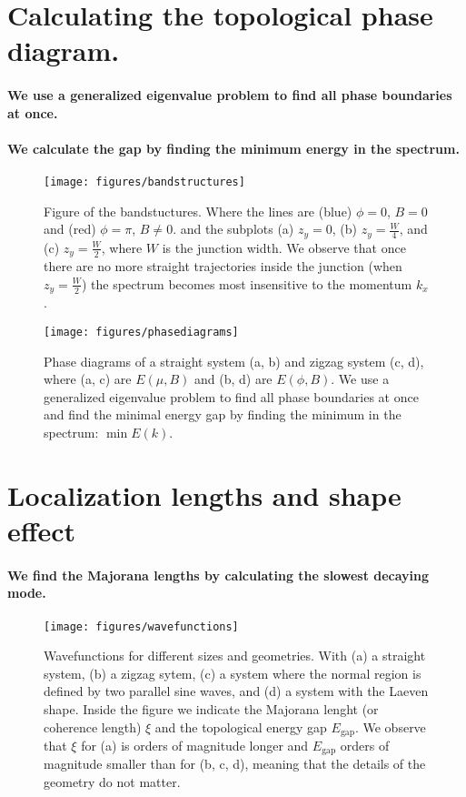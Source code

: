\documentclass[english, twocolumn, 10pt, aps, superscriptaddress, floatfix, prb, citeautoscript]{revtex4-1}
\renewcommand{\comment}[2]{#2}
\renewcommand{\comment}{\paragraph}
\begin{document}
\section{Calculating the topological phase diagram.}

\comment{We use a generalized eigenvalue problem to find all phase boundaries at once.}

\comment{We calculate the gap by finding the minimum energy in the spectrum.}

\begin{figure}[!htb]
\texttt{[image: figures/bandstructures]}
\caption{Figure of the bandstuctures.
Where the lines are (blue) $\phi=0$, $B=0$ and (red) $\phi=\pi$, $B \ne 0$.
and the subplots (a) $z_y=0$, (b) $z_y=\frac{W}{4}$, and (c) $z_y=\frac{W}{2}$, where $W$ is the junction width.
We observe that once there are no more straight trajectories inside the junction (when $z_y=\frac{W}{2}$) the spectrum becomes most insensitive to the momentum $k_x$.
\label{fig:bandstuctures}}
\end{figure}

\begin{figure}[!htb]
\texttt{[image: figures/phasediagrams]}
\caption{Phase diagrams of a straight system (a, b) and zigzag system (c, d), where (a, c) are $E(\mu, B)$ and (b, d) are $E(\phi, B)$.
We use a generalized eigenvalue problem to find all phase boundaries at once and find the minimal energy gap by finding the minimum in the spectrum: $\min{E(k)}$.
\label{fig:phasediagrams}}
\end{figure}


\section{Localization lengths and shape effect}

\comment{We find the Majorana lengths by calculating the slowest decaying mode.}

\begin{figure}[!htb]
\texttt{[image: figures/wavefunctions]}
\caption{Wavefunctions for different sizes and geometries.
With (a) a straight system, (b) a zigzag sytem, (c) a system where the normal region is defined by two parallel sine waves, and (d) a system with the Laeven shape.
Inside the figure we indicate the Majorana lenght (or coherence length) $\xi$ and the topological energy gap $E_\textrm{gap}.$
We observe that $\xi$ for (a) is orders of magnitude longer and $E_\textrm{gap}$ orders of magnitude smaller than for (b, c, d), meaning that the details of the geometry do not matter.
\label{fig:wavefunctions}}
\end{figure}
\end{document}
